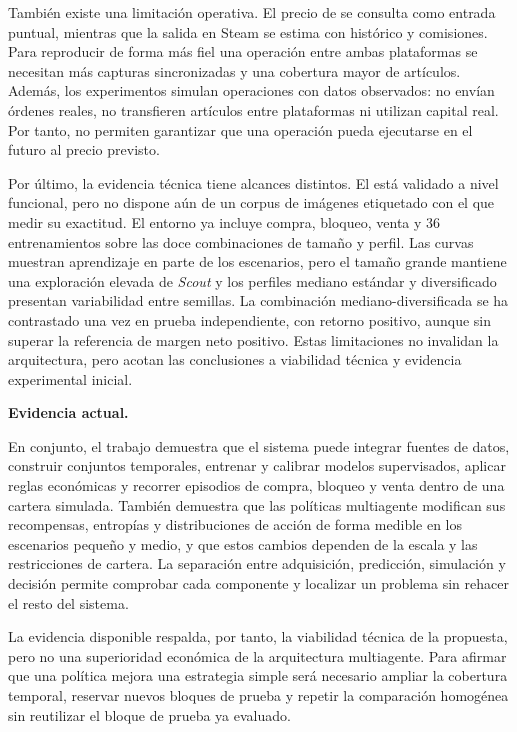 También existe una limitación operativa. El precio de  se consulta como entrada puntual, mientras que la salida en Steam se estima con histórico y comisiones. Para reproducir de forma más fiel una operación entre ambas plataformas se necesitan más capturas sincronizadas y una cobertura mayor de artículos. Además, los experimentos simulan operaciones con datos observados: no envían órdenes reales, no transfieren artículos entre plataformas ni utilizan capital real. Por tanto, no permiten garantizar que una operación pueda ejecutarse en el futuro al precio previsto.

Por último, la evidencia técnica tiene alcances distintos. El  está validado a nivel funcional, pero no dispone aún de un corpus de imágenes etiquetado con el que medir su exactitud. El entorno  ya incluye compra, bloqueo, venta y 36 entrenamientos sobre las doce combinaciones de tamaño y perfil. Las curvas muestran aprendizaje en parte de los escenarios, pero el tamaño grande mantiene una exploración elevada de \textit{Scout} y los perfiles mediano estándar y diversificado presentan variabilidad entre semillas. La combinación mediano-diversificada se ha contrastado una vez en prueba independiente, con retorno positivo, aunque sin superar la referencia de margen neto positivo. Estas limitaciones no invalidan la arquitectura, pero acotan las conclusiones a viabilidad técnica y evidencia experimental inicial.

\textbf{Evidencia actual.}

En conjunto, el trabajo demuestra que el sistema puede integrar fuentes de datos, construir conjuntos temporales, entrenar y calibrar modelos supervisados, aplicar reglas económicas y recorrer episodios de compra, bloqueo y venta dentro de una cartera simulada. También demuestra que las políticas multiagente modifican sus recompensas, entropías y distribuciones de acción de forma medible en los escenarios pequeño y medio, y que estos cambios dependen de la escala y las restricciones de cartera. La separación entre adquisición, predicción, simulación y decisión permite comprobar cada componente y localizar un problema sin rehacer el resto del sistema.

La evidencia disponible respalda, por tanto, la viabilidad técnica de la propuesta, pero no una superioridad económica de la arquitectura multiagente. Para afirmar que una política mejora una estrategia simple será necesario ampliar la cobertura temporal, reservar nuevos bloques de prueba y repetir la comparación homogénea sin reutilizar el bloque de prueba ya evaluado.
